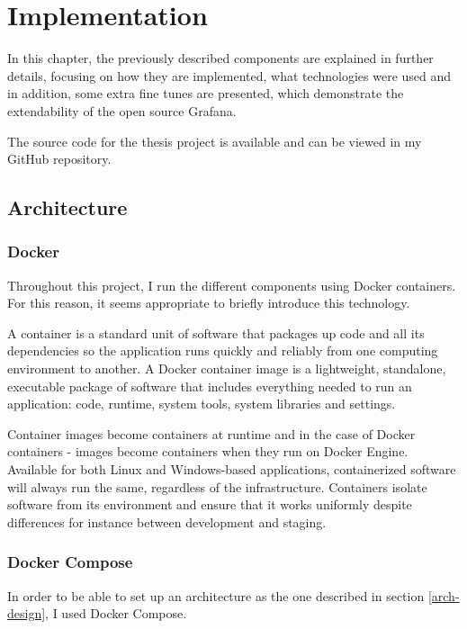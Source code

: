 \chapter{Implementation}

In this chapter, the previously described components are explained in further details, focusing on how they are implemented, what technologies were used and in addition, some extra fine tunes are presented, which demonstrate the extendability of the open source Grafana.

The source code for the thesis project is available and can be viewed in my GitHub repository.\cite{thesis-repo}

\section{Architecture}

\subsection{Docker}

Throughout this project, I run the different components using Docker containers. For this reason, it seems appropriate to briefly introduce this technology.

A container is a standard unit of software that packages up code and all its dependencies so the application runs quickly and reliably from one computing environment to another. A Docker container image is a lightweight, standalone, executable package of software that includes everything needed to run an application: code, runtime, system tools, system libraries and settings.

Container images become containers at runtime and in the case of Docker containers - images become containers when they run on Docker Engine. Available for both Linux and Windows-based applications, containerized software will always run the same, regardless of the infrastructure. Containers isolate software from its environment and ensure that it works uniformly despite differences for instance between development and staging.\cite{docker}


\subsection{Docker Compose}

In order to be able to set up an architecture as the one described in section \ref{arch-design}, I used Docker Compose.

